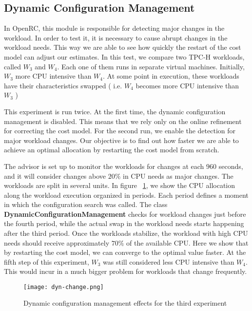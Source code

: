 \subsection{Dynamic Configuration Management}

In OpenRC, this module is responsible for detecting major changes in the workload. In order to test it, it is necessary to cause abrupt changes in the workload needs. This way we are able to see how quickly the restart of the cost model can adjust our estimates. In this test, we compare two TPC-H workloads, called $W_{3}$ and $W_{4}$. Each one of them runs in separate virtual machines. Initially, $W_{3}$ more CPU intensive than $W_{4}$. At some point in execution, these workloads have their characteristics swapped ( i.e. $W_{4}$ becomes more CPU intensive than $W_{3}$ )

This experiment is run twice. At the first time, the dynamic configuration management is disabled. This means that we rely only on the online refinement for correcting the cost model. For the second run, we enable the detection for major workload changes. Our objective is to find out how faster we are able to achieve an optimal allocation by restarting the cost model from scratch.

The advisor is set up to monitor the workloads for changes at each $960$ seconds, and it will consider changes above $20\%$ in CPU needs as major changes. The workloads are split in several units. In figure ~\ref{fig:wkchanges}, we show the CPU allocation along the workload execution organized in periods. Each period defines a moment in which the configuration search was called. The class \textbf{DynamicConfigurationManagement} checks for workload changes just before the fourth period, while the actual swap in the workload needs starts happening after the third period. Once the workloads stabilize, the workload with high CPU needs should receive approximately $70\%$  of the available CPU. Here we show that by restarting the cost model, we can converge to the optimal value faster. At the fifth step of this experiment, $W_{3}$  was still considered less CPU intensive than $W_{4}$. This would incur in a much bigger problem for workloads that change frequently.

\begin{figure}[ht]
 \centering
 \texttt{[image: dyn-change.png]}
 \caption{Dynamic configuration management effects for the third experiment}
 \label{fig:wkchanges}
\end{figure} 


